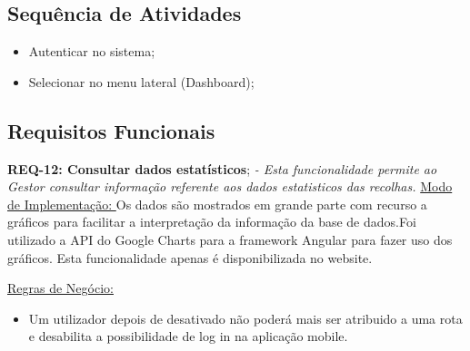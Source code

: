 \documentclass{scrreprt}
\begin{document}
	\subsection{Sequência de Atividades}
	
	\begin{itemize}
		\item Autenticar no sistema;
		\item Selecionar no menu lateral (Dashboard);
	\end{itemize}
	
	\subsection{Requisitos Funcionais}
	\textbf{REQ-12: Consultar dados estatísticos};\newline
	    \textit{- Esta funcionalidade permite ao Gestor consultar informação referente aos dados estatisticos das recolhas.}\newline\newline
		\underline{Modo de Implementação: }Os dados são mostrados em grande parte com recurso a gráficos para facilitar a interpretação da informação da base de dados.Foi utilizado a API do Google Charts para a framework Angular para fazer uso dos gráficos. Esta funcionalidade apenas é disponibilizada no website.
		\newline\newline
		
		\underline{Regras de Negócio: } 
		\begin{itemize}
		\item Um utilizador depois de desativado não poderá mais ser atribuido a uma rota e desabilita a possibilidade de log in na aplicação mobile.
    	\end{itemize}
		
\end{document}
